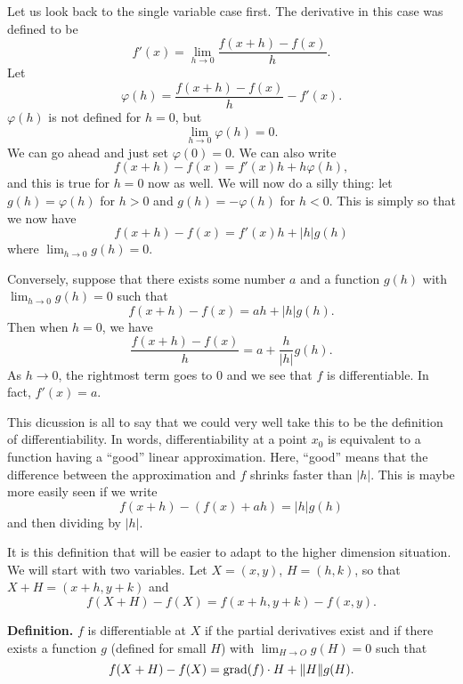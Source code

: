 \documentclass{article}
\DeclareMathOperator{\grd}{grad}
\begin{document}
Let us look back to the single variable case first. The derivative
in this case was defined to be
\[f'(x) = \lim_{h \to 0} \frac{f(x+h) - f(x)}{h}.\]
Let 
\[\varphi(h) = \frac{f(x+h) - f(x)}{h} - f'(x).\]
$\varphi(h)$ is not defined for $h=0$, but 
\[\lim_{h \to 0} \varphi(h) = 0.\]
We can go ahead and just set $\varphi(0)=0$.
We can also write 
\[f(x+h) - f(x) = f'(x)h + h\varphi(h),\]
and this is true for $h=0$ now as well. We will now do a silly thing:
let $g(h) = \varphi(h)$ for $h>0$ and $g(h) = -\varphi(h)$ for $h<0$. This is simply
so that we now have
\[f(x+h) - f(x) = f'(x)h + |h|g(h)\]
where $\lim_{h\to 0} g(h)=0$.

Conversely, suppose that there exists some number $a$ 
and a function $g(h)$ 
with $\lim_{h \to 0} g(h) = 0$ such that
\[f(x+h) - f(x) = ah + |h|g(h).\]
Then when $h=0$, we have
\[\frac{f(x+h)-f(x)}{h} = a + \frac{h}{|h|} g(h).\]
As $h \to 0$, the rightmost term goes to $0$ and we see that $f$
is differentiable. In fact, $f'(x) = a$.


This dicussion is all to say that we could very well take this
to be the definition of differentiability. In words, differentiability
at a point $x_0$ is equivalent to a function having a ``good'' linear approximation.
Here, ``good'' means that the difference between the approximation and $f$
shrinks faster than $|h|$. This is maybe more easily seen if we write
\[f(x+h) - \left( f(x) + ah \right) = |h|g(h)\]
and then dividing by $|h|$.

It is this definition that will be easier to adapt to the higher dimension 
situation. We will start with two variables. Let $X=(x,y)$, $H=(h,k)$,
so that $X+H=(x+h,y+k)$ and 
\[f(X+H)-f(X) = f(x+h,y+k) - f(x,y).\]

\textbf{Definition.} $f$ is differentiable at $X$ if the partial derivatives 
exist and if there exists a function $g$ (defined for small $H$) 
with $\lim_{H \to O} g(H) = 0$ such that
\[f(X+H) - f(X) = \grd(f)\cdot H + \norm{H}g(H).\]
\end{document}
